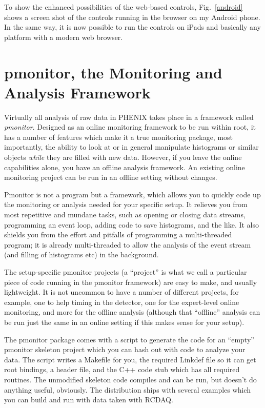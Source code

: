 \documentclass{article}[11pt]
\begin{document}
To show the enhanced possibilities of the web-based controls,
Fig.~\ref{android} shows a screen shot of the controls running in the
browser on my Android phone. In the same way, it is now possible to
run the controls on iPads and basically any platform with a modern web
browser.


\section{pmonitor, the Monitoring and Analysis Framework}

Virtually all analysis of raw data in PHENIX takes place in a
framework called \emph{pmonitor}. Designed as an online monitoring
framework to be run within root, it has a number of features which
make it a true monitoring package, most importantly, the ability to
look at or in general manipulate histograms or similar objects
\emph{while} they are filled with new data. However, if you leave the
online capabilities alone, you have an offline analysis framework. An
existing online monitoring project can be run in an offline setting
without changes.

Pmonitor is not a program but a framework, which allows you to quickly
code up the monitoring or analysis needed for your specific setup.  It
relieves you from most repetitive and mundane tasks, such as opening or
closing data streams, programming an event loop, adding code to save
histograms, and the like. It also shields you from the effort and
pitfalls of programming a multi-threaded program; it is already
multi-threaded to allow the analysis of the event stream (and filling
of histograms etc) in the background. 

The setup-specific pmonitor projects (a ``project'' is what we call a
particular piece of code running in the pmonitor framework) are easy
to make, and usually lightweight. It is not uncommon to have a number
of different projects, for example, one to help timing in the
detector, one for the expert-level online monitoring, and more for the
offline analysis (although that ``offline'' analysis can be run just
the same in an online setting if this makes sense for your setup).

The pmonitor package comes with a script to generate the code for an
``empty'' pmonitor skeleton project which you can hash out with code
to analyze your data. The script writes a Makefile for you, the
required Linkdef file so it can get root bindings, a header file, and
the C++ code stub which has all required routines. The unmodified skeleton
code compiles and can be run, but doesn't do anything useful,
obviously. The distribution ships with several examples which you can
build and run with data taken with RCDAQ.
\end{document}
